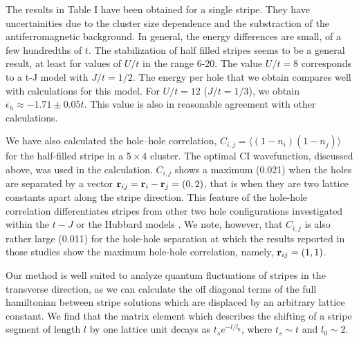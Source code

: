 The results in Table I  have been obtained for a single stripe.
They have uncertainities
due to the cluster size dependence and the substraction of the
antiferromagnetic background. In general, the energy differences are small,
of a few hundredths of $t$.
The stabilization of half filled stripes seems to be
a general result, at least for values of $U/t$ in the range 6-20.
The value $U/t = 8$ corresponds to a t-J model with
$J/t = 1/2$. The energy per hole that we obtain compares
well with calculations for this model\cite{WS00}. For $U/t = 12$
($J/t = 1/3$), we obtain $\epsilon_h \approx -1.71 \pm 0.05 t$.
This value is
also in reasonable agreement with other calculations\cite{WS98b}.

We have also calculated the hole--hole 
correlation, $C_{i,j}=\langle ( 1 - n_i ) ( 1 - n_j ) \rangle$ 
for the half-filled stripe in a 
$5 \times 4$ cluster. The optimal CI wavefunction, 
discussed above, was used in the calculation. $C_{i,j}$
shows a maximum (0.021) when the holes are separated by a
vector  ${\bf r}_{ij}={\bf r}_i-{\bf r}_j=(0,2)$, that is when they are
two lattice constants apart along the stripe direction.
This feature of the hole-hole correlation differentiates stripes from
other two hole configurations investigated within the $t-J$ \cite{RD97} or the
Hubbard models \cite{FO90,LG98}. We note, however, that $C_{i,j}$ is also rather
large (0.011) for the hole-hole separation at which the results 
reported in those studies show the maximum hole-hole correlation, namely,
${\bf r}_{ij}=(1,1)$.

Our method is well suited to analyze quantum fluctuations of stripes in the
transverse direction, as we can calculate the off diagonal terms of the
full hamiltonian between stripe solutions which are displaced by an arbitrary
lattice constant. We find that the matrix element which describes the 
shifting of a stripe segment of length $l$ 
by one lattice unit decays as $t_s e^{-l/l_0}$, where
$t_s \sim t$ and $l_0 \sim 2$.


